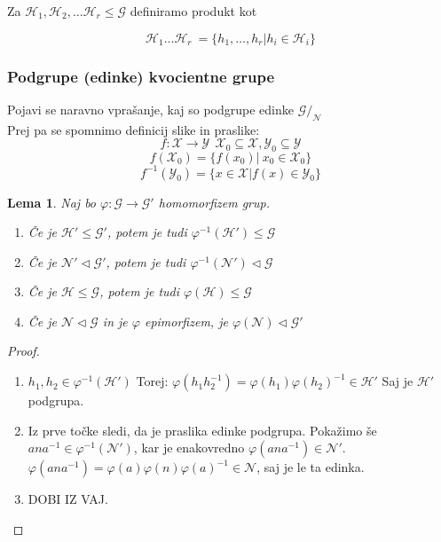 \documentclass[a4paper]{article}
\newtheorem{lemma}{Lema}
\begin{document}
Za $\mathcal{H}_1, \mathcal{H}_2, \dots \mathcal{H}_r \leq \mathcal{G}$ definiramo produkt kot

$$
\mathcal{H}_1 \dots\mathcal{H}_r \:= \{h_1, \dots, h_r | h_i \in \mathcal{H}_i \}
$$

\subsubsection{Podgrupe (edinke) kvocientne grupe}

Pojavi se naravno vprašanje, kaj so podgrupe edinke $\mathcal{G}/_{\mathcal{N}}$\\
Prej pa se spomnimo definicij slike in praslike:
$$f: \mathcal{X} \to \mathcal{Y} \ \ \mathcal{X}_0 \subseteq \mathcal{X}, \mathcal{Y}_0 \subseteq \mathcal{Y}$$
$$f(\mathcal{X}_0) = \{ f(x_0) | \ x_0 \in \mathcal{X}_0\}$$
$$f^{-1}(\mathcal{Y}_0) = \{ x \in \mathcal{X} | f(x) \in \mathcal{Y}_0\}$$


\begin{lemma}
Naj bo $\varphi :\mathcal{G} \to \mathcal{G}'$ homomorfizem grup.
\begin{enumerate}
\item Če je $\mathcal{H}' \leq \mathcal{G}'$, potem je tudi $\varphi^{-1}(\mathcal{H}') \leq \mathcal{G}$
\item Če je $\mathcal{N}' \triangleleft \mathcal{G}'$, potem je tudi $\varphi^{-1}(\mathcal{N}') \triangleleft \mathcal{G}$
\item Če je $\mathcal{H} \leq \mathcal{G}$, potem je tudi $\varphi(\mathcal{H}) \leq \mathcal{G}$
\item Če je $\mathcal{N} \triangleleft \mathcal{G}$ in je $\varphi$ epimorfizem, je $\varphi(\mathcal{N}) \triangleleft \mathcal{G}'$
\end{enumerate}
\end{lemma}

\begin{proof}\leavevmode
\begin{enumerate}
\item $h_1, h_2 \in \varphi^{-1}(\mathcal{H}')$ Torej: $\varphi(h_1h_2^{-1}) = \varphi(h_1) \varphi(h_2)^{-1} \in \mathcal{H}'$ Saj je $\mathcal{H}'$ podgrupa.
\item Iz prve točke sledi, da je praslika edinke podgrupa. Pokažimo še $ana^{-1} \in \varphi^{-1}(\mathcal{N}')$, kar je enakovredno $\varphi(ana^{-1}) \in \mathcal{N}'$. $\varphi(ana^{-1}) = \varphi(a) \varphi(n) \varphi(a)^{-1} \in \mathcal{N}$, saj je le ta edinka.
\item DOBI IZ VAJ.

\end{enumerate}
\end{proof}
\end{document}
